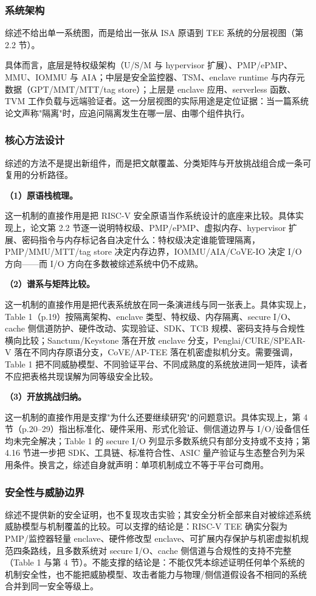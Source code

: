 \documentclass[11pt]{ctexart}
\begin{document}
\subsubsection{系统架构}
综述不给出单一系统图，而是给出一张从 ISA 原语到 TEE 系统的分层视图（第 2.2 节）。\par
具体而言，底层是特权级架构（U/S/M 与 hypervisor 扩展）、PMP/ePMP、MMU、IOMMU 与 AIA；中层是安全监控器、TSM、enclave runtime 与内存元数据（GPT/MMT/MTT/tag store）；上层是 enclave 应用、serverless 函数、TVM 工作负载与远端验证者。这一分层视图的实际用途是定位证据：当一篇系统论文声称"隔离"时，应追问隔离发生在哪一层、由哪个组件执行。\par
\subsubsection{核心方法设计}
综述的方法不是提出新组件，而是把文献覆盖、分类矩阵与开放挑战组合成一条可复用的分析路径。\par
\noindent\textbf{（1）原语栈梳理。}\par
这一机制的直接作用是把 RISC-V 安全原语当作系统设计的底座来比较。具体实现上，论文第 2.2 节逐一说明特权级、PMP/ePMP、虚拟内存、hypervisor 扩展、密码指令与内存标记各自决定什么：特权级决定谁能管理隔离，PMP/MMU/MTT/tag store 决定内存边界，IOMMU/AIA/CoVE-IO 决定 I/O 方向——而 I/O 方向在多数被综述系统中仍不成熟。\par
\noindent\textbf{（2）谱系与矩阵比较。}\par
这一机制的直接作用是把代表系统放在同一条演进线与同一张表上。具体实现上，Table 1（p.19）按隔离架构、enclave 类型、特权级、内存隔离、secure I/O、cache 侧信道防护、硬件改动、实现验证、SDK、TCB 规模、密码支持与合规性横向比较；Sanctum/Keystone 落在开放 enclave 分支，Penglai/CURE/SPEAR-V 落在不同内存原语分支，CoVE/AP-TEE 落在机密虚拟机分支。需要强调，Table 1 把不同威胁模型、不同验证平台、不同成熟度的系统放进同一矩阵，读者不应把表格共现误解为同等级安全比较。\par
\noindent\textbf{（3）开放挑战归纳。}\par
这一机制的直接作用是支撑"为什么还要继续研究"的问题意识。具体实现上，第 4 节（p.20--29）指出标准化、硬件采用、形式化验证、侧信道边界与 I/O/设备信任均未完全解决；Table 1 的 secure I/O 列显示多数系统只有部分支持或不支持；第 4.16 节进一步把 SDK、工具链、标准符合性、ASIC 量产验证与生态整合列为采用条件。换言之，综述自身就声明：单项机制成立不等于平台可商用。\par
\subsubsection{安全性与威胁边界}
综述不提供新的安全证明，也不复现攻击实验；其安全分析全部来自对被综述系统威胁模型与机制覆盖的比较。可以支撑的结论是：RISC-V TEE 确实分裂为 PMP/监控器轻量 enclave、硬件修改型 enclave、可扩展内存保护与机密虚拟机规范四条路线，且多数系统对 secure I/O、cache 侧信道与合规性的支持不完整（Table 1 与第 4 节）。不能支撑的结论是：不能仅凭本综述证明任何单个系统的机制安全性，也不能把威胁模型、攻击者能力与物理/侧信道假设各不相同的系统合并到同一安全等级上。\par
\end{document}
